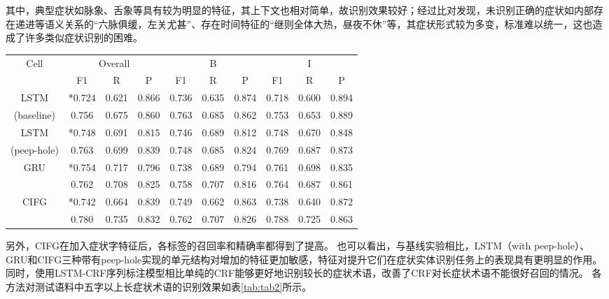 其中，典型症状如脉象、舌象等具有较为明显的特征，其上下文也相对简单，故识别效果较好；经过比对发现，未识别正确的症状如内部存在递进等语义关系的“六脉俱缓，左关尤甚”、存在时间特征的“继则全体大热，昼夜不休”等，其症状形式较为多变，标准难以统一，这也造成了许多类似症状识别的困难。
\begin{table}[H]
    \centering
    \begin{tabular}{cccccccccc}
        \toprule
            \multirow{2}{*}{Cell} &\multicolumn{3}{c}{Overall} &\multicolumn{3}{c}{B} &\multicolumn{3}{c}{I}\\
            \cmidrule(lr){2-4} \cmidrule(lr){5-7} \cmidrule(lr){8-10}
            & F1 & R & P & F1 & R & P & F1 & R & P\\
        \midrule
            LSTM & *0.724 & 0.621 & 0.866 & 0.736 & 0.635 & 0.874 & 0.718 & 0.600 & 0.894\\
            (baseline) & 0.756 & 0.675 & 0.860 & 0.763 & 0.685 & 0.862 & 0.753 & 0.653 & 0.889\\
            LSTM & *0.748 & 0.691 & 0.815 & 0.746 & 0.689 & 0.812 & 0.748 & 0.670 & 0.848\\
            (peep-hole) & 0.763 & 0.699 & 0.839 & 0.748 & 0.685 & 0.824 & 0.769 & 0.687 & 0.873\\
            \multirow{2}{2cm}{GRU} & *0.754 & 0.717 & 0.796 & 0.738 & 0.689 & 0.794 & 0.761 & 0.698 & 0.835\\
                                 & 0.762 & 0.708 & 0.825 & 0.758 & 0.707 & 0.816 & 0.764 & 0.687 & 0.861\\
            \multirow{2}{2cm}{CIFG} & *0.742 & 0.664 & 0.839 & 0.749 & 0.662 & 0.863 & 0.738 & 0.640 & 0.872\\
                                  & 0.780 & 0.735 & 0.832 & 0.762 & 0.707 & 0.826 & 0.788 & 0.725 & 0.863\\
        \bottomrule
    \end{tabular}
    \label{tab:tab1}
\end{table}
另外，CIFG在加入症状字特征后，各标签的召回率和精确率都得到了提高。
也可以看出，与基线实验相比，LSTM（with peep-hole）、GRU和CIFG三种带有peep-hole实现的单元结构对增加的特征更加敏感，特征对提升它们在症状实体识别任务上的表现具有更明显的作用。
同时，使用LSTM-CRF序列标注模型相比单纯的CRF能够更好地识别较长的症状术语，改善了CRF对长症状术语不能很好召回的情况\citep{王世昆2009基于条件随机场的中医命名实体识别}。
各方法对测试语料中五字以上长症状术语的识别效果如表\ref{tab:tab2}所示。


